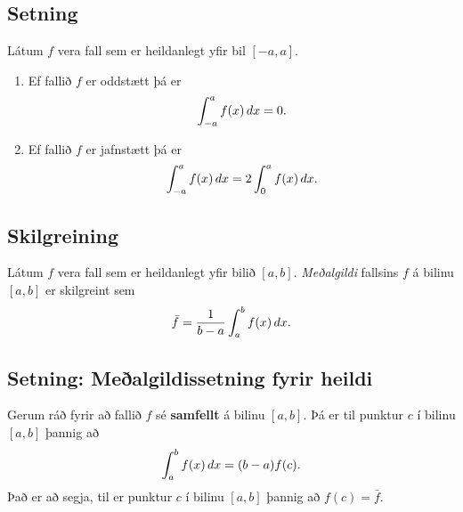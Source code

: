 \documentclass[b5paper,10pt,icelandic]{sphinxmanual}
\begin{document}
\subsection{Setning}
\label{kafli06:id6}
Látum \(f\) vera fall sem er heildanlegt yfir bil \([-a, a]\).
\begin{enumerate}
\item {} 
Ef fallið \(f\) er oddstætt þá er
\begin{gather}
\begin{split}\int_{-a}^a f(x)\,dx=0.\end{split}\notag
\end{gather}
\item {} 
Ef fallið \(f\) er jafnstætt þá er
\begin{gather}
\begin{split}\int_{-a}^a f(x)\,dx=2\int_0^a f(x)\,dx.\end{split}\notag
\end{gather}
\end{enumerate}


\subsection{Skilgreining}
\label{kafli06:id7}\label{kafli06:index-3}
Látum \(f\) vera fall sem er heildanlegt yfir bilið \([a, b]\).
\textit{Meðalgildi} fallsins \(f\) á bilinu \([a, b]\) er skilgreint
sem
\begin{gather}
\begin{split}\bar{f}=\frac{1}{b-a}\int_{a}^b f(x)\,dx.\end{split}\notag
\end{gather}

\subsection{Setning: Meðalgildissetning fyrir heildi}
\label{kafli06:setning-mealgildissetning-fyrir-heildi}\label{kafli06:index-4}
Gerum ráð fyrir að fallið \(f\) sé \textbf{samfellt} á bilinu
\([a, b]\). Þá er til punktur \(c\) í bilinu \([a, b]\)
þannig að
\begin{gather}
\begin{split}\int_a^b f(x)\,dx=(b-a)f(c).\end{split}\notag
\end{gather}
Það er að segja, til er punktur \(c\) í bilinu \([a, b]\) þannig
að \(f(c)=\bar{f}\).
\end{document}

